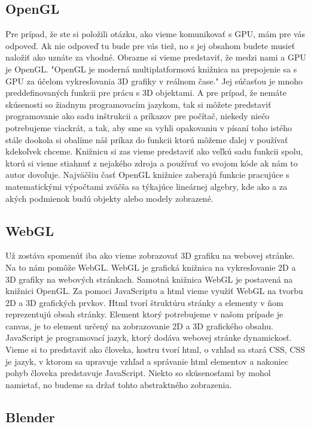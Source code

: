 \documentclass[10pt,twoside,slovak,a4paper]{article}
\begin{document}
\subsection{OpenGL}

Pre prípad, že ste si položili otázku, ako vieme komunikovať s GPU, mám pre vás odpoveď. Ak nie odpoveď tu bude pre vás tiež, no s jej obsahom budete musieť naložiť ako uznáte za vhodné. Obrazne si vieme predstaviť, že medzi nami a GPU je OpenGL. "OpenGL je moderná multiplatformová knižnica na prepojenie sa s GPU za účelom vykresľovania 3D grafiky v reálnom čase." \cite{Graphics-openGL} Jej súčasťou je mnoho preddefinovaných funkcii pre prácu s 3D objektami. A pre prípad, že nemáte skúsenosti so žiadnym programovacím jazykom, tak si môžete predstaviť programovanie ako sadu inštrukcii a príkazov pre počítač, niekedy niečo potrebujeme viackrát, a tak, aby sme sa vyhli opakovaniu v písaní toho istého stále dookola si obalíme náš príkaz do funkcii ktorú môžeme ďalej v používať kdekoľvek chceme. Knižnicu si zas vieme predstaviť ako veľkú sadu funkcii spolu, ktorú si vieme stiahnuť z nejakého zdroja a používať vo svojom kóde ak nám to autor dovoľuje. Najväčšiu časť OpenGL knižnice zaberajú funkcie pracujúce s matematickými výpočtami zväčša sa týkajúce lineárnej algebry, kde ako a za akých podmienok budú objekty alebo modely zobrazené. 

\subsection{WebGL}

Už zostáva spomenúť iba ako vieme zobrazovať 3D grafiku na webovej stránke. Na to nám pomôže WebGL. WebGL je grafická knižnica na vykresľovanie 2D a 3D grafiky na webových stránkach. Samotná knižnica WebGL je postavená na knižnici OpenGL. Za pomoci JavaScriptu a html vieme využiť WebGL na tvorbu 2D a 3D grafických prvkov. Html tvorí štruktúru stránky a elementy v ňom reprezentujú obsah stránky. Element ktorý potrebujeme v našom prípade je canvas, je to element určený na zobrazovanie 2D a 3D grafického obsahu. JavaScript je programovací jazyk, ktorý dodáva webovej stránke dynamickosť. Vieme si to predstaviť ako človeka, kostru tvorí html, o vzhľad sa stará CSS,  CSS je jazyk, v ktorom sa upravuje vzhľad a správanie html elementov a nakoniec pohyb človeka predstavuje JavaScript. Niekto so skúsenosťami by mohol namietať, no budeme sa držať tohto abstraktného zobrazenia.

\subsection{Blender}
\end{document}
